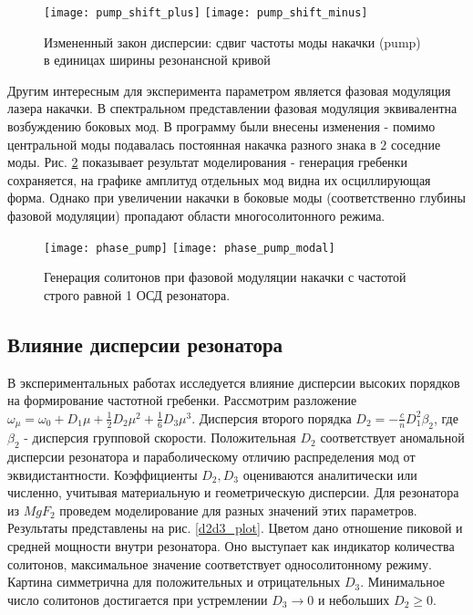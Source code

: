 \begin{figure}
  \centering
  \texttt{[image: pump\_shift\_plus]}
  \texttt{[image: pump\_shift\_minus]}
  \caption{Измененный закон дисперсии: сдвиг частоты моды накачки (pump) в единицах ширины резонансной кривой} \label{pump_shift}
\end{figure}

Другим интересным для эксперимента параметром является фазовая модуляция лазера накачки. В спектральном представлении фазовая модуляция эквивалентна возбуждению боковых мод. В программу были внесены изменения -  помимо центральной моды подавалась постоянная накачка разного знака в $2$ соседние моды. Рис. \ref{phase_pump} показывает результат моделирования - генерация гребенки сохраняется, на графике амплитуд отдельных мод видна их осциллирующая форма. Однако при увеличении накачки в боковые моды (соответственно глубины фазовой модуляции) пропадают области многосолитонного режима.

\begin{figure}
  \texttt{[image: phase\_pump]}
  \texttt{[image: phase\_pump\_modal]}
  \caption{Генерация солитонов при фазовой модуляции накачки с частотой строго равной 1 ОСД резонатора.} \label{phase_pump}
\end{figure}

\subsection{Влияние дисперсии резонатора}

В экспериментальных работах исследуется влияние дисперсии высоких порядков на формирование частотной гребенки. Рассмотрим разложение $\omega_\mu=\omega_0+D_1\mu+\frac{1}{2}D_2\mu^2+\frac{1}{6}D_3\mu^3$. Дисперсия второго порядка $D_2=-\frac{c}{n}D_1^2\beta_2$, где $\beta_2$ - дисперсия групповой скорости. Положительная $D_2$ соответствует аномальной дисперсии резонатора и параболическому отличию распределения мод от эквидистантности. Коэффициенты $D_2, D_3$ оцениваются аналитически или численно, учитывая материальную и геометрическую дисперсии. Для резонатора из $MgF_2$ проведем моделирование для разных значений этих параметров. Результаты представлены на рис. \ref{d2d3_plot}. Цветом дано отношение пиковой и средней мощности внутри резонатора. Оно выступает как индикатор количества солитонов, максимальное значение соответствует односолитонному режиму. Картина симметрична для положительных и отрицательных $D_3$. Минимальное число солитонов достигается при устремлении $D_3\rightarrow 0$ и небольших $D_2\ge0$.

